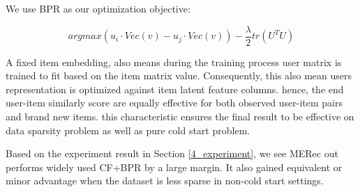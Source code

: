 We use BPR as our optimization objective:

\begin{equation}\label{skipgram}
    arg max (u_i \cdot Vec(v)-u_j \cdot Vec(v)) - \dfrac{\lambda}{2}tr(U^TU)
\end{equation}

A fixed item embedding, also means during the training process user matrix is trained to fit based on the item matrix value. Consequently, this also mean users representation is optimized against item latent feature columns. hence, the end user-item similarly score are equally effective for both observed user-item pairs and brand new items. this characteristic ensures the final result to be effective on data sparsity problem as well as pure cold start problem.

Based on the experiment result in Section \ref{4_experiment}, we see MERec out performs widely used CF+BPR by a large margin. It also gained equivalent or minor advantage when the dataset is less sparse in non-cold start settings.


